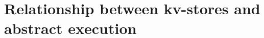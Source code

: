 \section{Relationship between kv-stores and abstract execution}
\label{sec:app-abstract-semantics-sound-complete}


%

%

